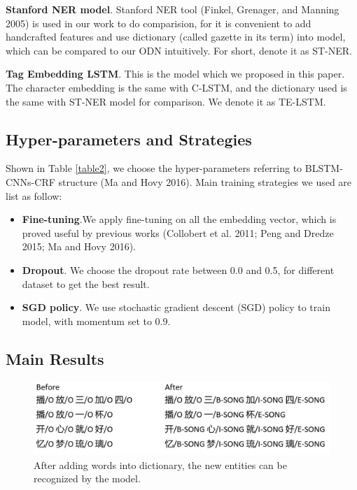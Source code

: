 \documentclass[letterpaper]{article} %
\begin{document}
\textbf{Stanford NER model}. Stanford NER tool (Finkel, Grenager, and Manning 2005) is used in our work to do comparision, for it is convenient to add handcrafted features and use dictionary (called gazette in its term) into model, which can be compared to our ODN intuitively. For short, denote it as ST-NER. 

\textbf{Tag Embedding LSTM}. This is the model which we proposed in this paper. The character embedding is the same with C-LSTM, and the dictionary used is the same with ST-NER model for comparison. We denote it as TE-LSTM.

\subsection{Hyper-parameters and Strategies}

Shown in Table \ref{table2}, we choose the hyper-parameters referring to BLSTM-CNNs-CRF structure (Ma and Hovy 2016). Main training strategies we used are list as follow:

\begin{itemize}
\item \textbf{Fine-tuning}.We apply fine-tuning on all the embedding vector, which is proved useful by previous works (Collobert et al. 2011; Peng and Dredze 2015; Ma and Hovy 2016). 
\item \textbf{Dropout}. We choose the dropout rate between 0.0 and 0.5, for different dataset to get the best result.
\item \textbf{SGD policy}. We use stochastic gradient descent (SGD) policy to train model, with momentum set to 0.9.
\end{itemize}

\subsection{Main Results}



\begin{figure}[t]
\centering
\includegraphics[width=0.8\columnwidth]{change_after_adding_song} %
\caption{After adding words into dictionary, the new entities can be recognized by the model.}
\label{fig3}
\end{figure}
\end{document}
